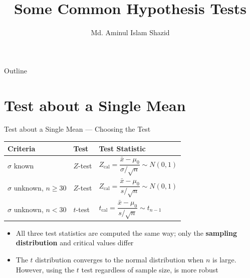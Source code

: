 \documentclass[12pt, aspectratio=169]{beamer}
\title{Some Common Hypothesis Tests}
\author{Md. Aminul Islam Shazid}
\date{}
\begin{document}
    {
        \addtocounter{framenumber}{-2}

        \begin{frame}
            \titlepage
        \end{frame}

        \begin{frame}{Outline}
            \vfill
            \tableofcontents[subsectionstyle=hide]
            \vfill
        \end{frame}
    }

    \section{Test about a Single Mean}


    \begin{frame}{Test about a Single Mean --- Choosing the Test}
        \begin{center}
            \begin{tabular}{lll}
                \toprule
                \textbf{Criteria} & \textbf{Test} & \textbf{Test Statistic} \\
                \midrule
                $\sigma$ known & $Z$-test &
                    $Z_{\text{cal}} = \dfrac{\bar{x} - \mu_0}{\sigma/\sqrt{n}} \sim N(0,1)$ \\[1.2em]
                $\sigma$ unknown, $n \geqslant 30$ & $Z$-test &
                    $Z_{\text{cal}} = \dfrac{\bar{x} - \mu_0}{s/\sqrt{n}} \sim N(0,1)$ \\[1.2em]
                $\sigma$ unknown, $n < 30$ & $t$-test &
                    $t_{\text{cal}} = \dfrac{\bar{x} - \mu_0}{s/\sqrt{n}} \sim t_{n-1}$ \\
                \bottomrule
            \end{tabular}
        \end{center}

        \begin{itemize}
            \item All three test statistics are computed the same way; only the
                \textbf{sampling distribution} and critical values differ
            \item The \(t\) distribution converges to the normal distribution when \(n\) is large. However, using the \(t\) test regardless of sample size, is more robust
        \end{itemize}
    \end{frame}
\end{document}
